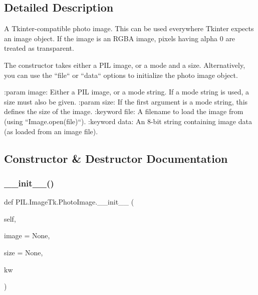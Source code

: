 \subsection{Detailed Description}
\begin{DoxyVerb}A Tkinter-compatible photo image.  This can be used
everywhere Tkinter expects an image object.  If the image is an RGBA
image, pixels having alpha 0 are treated as transparent.

The constructor takes either a PIL image, or a mode and a size.
Alternatively, you can use the ``file`` or ``data`` options to initialize
the photo image object.

:param image: Either a PIL image, or a mode string.  If a mode string is
              used, a size must also be given.
:param size: If the first argument is a mode string, this defines the size
             of the image.
:keyword file: A filename to load the image from (using
               ``Image.open(file)``).
:keyword data: An 8-bit string containing image data (as loaded from an
               image file).
\end{DoxyVerb}
 

\subsection{Constructor \& Destructor Documentation}
\mbox{\label{classPIL_1_1ImageTk_1_1PhotoImage_aad15cc3e51d014a485fc088bbacddaf5}} 
\subsubsection{\texorpdfstring{\+\_\+\+\_\+init\+\_\+\+\_\+()}{\_\_init\_\_()}}
{\footnotesize\ttfamily def P\+I\+L.\+Image\+Tk.\+Photo\+Image.\+\_\+\+\_\+init\+\_\+\+\_\+ (\begin{DoxyParamCaption}\item[{}]{self,  }\item[{}]{image = {\ttfamily None},  }\item[{}]{size = {\ttfamily None},  }\item[{}]{kw }\end{DoxyParamCaption})}


